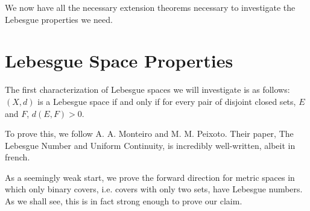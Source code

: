 \documentclass[openany, amssymb, psamsfonts]{amsart}
\theoremstyle{definition}
\numberwithin{equation}{section}
\begin{document}
We now have all the necessary extension theorems necessary to investigate the Lebesgue properties we need. 
\section{Lebesgue Space Properties}

The first characterization of Lebesgue spaces we will investigate is as follows:
$(X,d)$ is a Lebesgue space if and only if for every pair of disjoint closed sets, $E$ and $F$, $d(E,F) > 0$.

To prove this, we follow A. A. Monteiro and M. M. Peixoto. Their paper, The Lebesgue Number and Uniform Continuity, \cite{mont-peix} is incredibly well-written, albeit in french.

As a seemingly weak start, we prove the forward direction for metric spaces in which only binary covers, i.e. covers with only two sets, have Lebesgue numbers. As we shall see, this is in fact strong enough to prove our claim.
\end{document}
